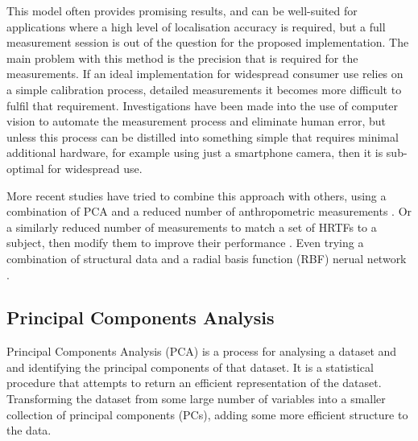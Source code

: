 This model often provides promising results, and can be well-suited for applications where a high level of localisation accuracy is required, but a full measurement session is out of the question for the proposed implementation. The main problem with this method is the precision that is required for the measurements. If an ideal implementation for widespread consumer use relies on a simple calibration process, detailed measurements it becomes more difficult to fulfil that requirement. Investigations have been made into the use of computer vision to automate the measurement process and eliminate human error\citep{Mohan2003}, but unless this process can be distilled into something simple that requires minimal additional hardware, for example using just a smartphone camera, then it is sub-optimal for widespread use. 

More recent studies have tried to combine this approach with others, using a combination of PCA and a reduced number of anthropometric measurements \citep{Hugeng2010}. Or a similarly reduced number of measurements to match a set of HRTFs to a subject, then modify them to improve their performance \citep{Tashev2014}. Even trying a combination of structural data and a radial basis function (RBF) nerual network \citep{Li2013}.  

\subsection{Principal Components Analysis}
Principal Components Analysis \citep{Pearson1901} (PCA) is a process for analysing a dataset and and identifying the principal components of that dataset. It is a statistical procedure that attempts to return an efficient representation of the dataset. Transforming the dataset from some large number of variables into a smaller collection of principal components (PCs), adding some more efficient structure to the data. 


